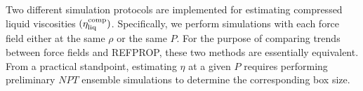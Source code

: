 \documentclass[preprint,review,12pt]{elsarticle}
\begin{document}
%	
	
	Two different simulation protocols are implemented for estimating compressed liquid viscosities $(\eta_{\rm liq}^{\rm comp})$. Specifically, we perform simulations with each force field either at the same $\rho$ or the same $P$. For the purpose of comparing trends between force fields and REFPROP, these two methods are essentially equivalent. From a practical standpoint, estimating $\eta$ at a given $P$ requires performing preliminary $NPT$ ensemble simulations to determine the corresponding box size.
	
	
%	 
	
\end{document}
